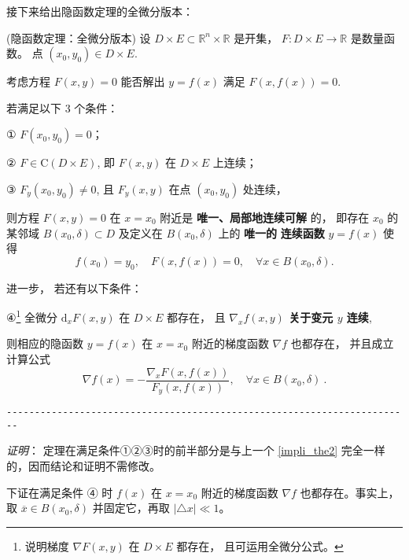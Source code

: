 接下来给出隐函数定理的全微分版本：
 \begin{theorem}{(隐函数定理：全微分版本)}
 设 $D\times E\subset\mathbb{R}^{n}\times\mathbb{R}$ 是开集， $F:D\times E\rightarrow\mathbb{R}$
是数量函数。 点 $(x_{0},y_{0})\in D\times E.$ 

考虑方程 $F(x,y)=0$ 能否解出 $y=f(x)$ 满足 $F(x,f(x))=0.$ 

若满足以下 3 个条件：

① $F(x_{0},y_{0})=0$；

② $F\in\mathrm{C}(D\times E)$, 即 $F(x,y)$ 在 $D\times E$ 上连续； 

③ $F_{y}(x_{0},y_{0})\neq0$, 且 $F_{y}(x,y)$ 在点 $(x_0,y_0)$ 处连续，

则方程 $F(x,y)=0$ 在 $x=x_{0}$ 附近是\textbf{ 唯一、局部地连续可解} 的， 即存在 $x_{0}$
的某邻域 $B(x_{0},\delta)\subset D$ 及定义在 $B(x_{0},\delta)$ 上的 \textbf{唯一的} \textbf{
连续函数} $y=f(x)$ 使得
\[
f(x_{0})=y_{0},\quad F(x,f(x))=0,\quad\forall x\in B(x_{0},\delta).
\]

进一步， 若还有以下条件：

④\footnote{说明梯度 $\nabla F(x,y)$ 在 $D\times E$ 都存在， 且可运用全微分公式。} 全微分 $\mathrm{d}_{x}F(x,y)$ 在 $D\times E$ 都存在， 且 \textbf{$\nabla_x f(x,y)$ 关于变元 $y$ 连续},

则相应的隐函数 $y=f(x)$ 在 $x=x_{0}$ 附近的梯度函数 $\nabla f$ 也都存在， 并且成立计算公式
\[
\nabla f(x)=-{\displaystyle \frac{\nabla_{x}F(x,f(x))}{F_{y}(x,f(x))}},\quad\forall x\in B(x_{0},\delta)~.
\]

\verb|------------------------------------------------------------------------|

\textsl{证明}： 定理在满足条件①②③时的前半部分是与上一个 \autoref{impli_the2} 完全一样的，因而结论和证明不需修改。

下证在满足条件 ④ 时 $f(x)$ 在 $x=x_{0}$ 附近的梯度函数 $\nabla f$ 也都存在。事实上， 取 $\overline{x}\in B(x_{0},\delta)$ 并固定它，再取 $\left|\triangle x\right|\ll1$。 %


\end{theorem}

